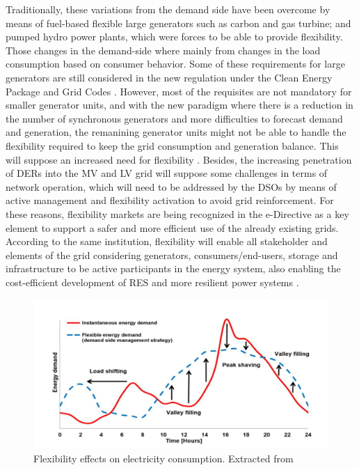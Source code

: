 Traditionally, these variations from the demand side have been overcome by means of fuel-based flexible large generators such as carbon and gas turbine; and pumped hydro power plants, which were forces to be able to provide flexibility. Those changes in the demand-side where mainly from changes in the load consumption based on consumer behavior.
Some of these requirements for large generators are still considered in the new regulation under the Clean Energy Package and Grid Codes \cite{validzic2017clean}. However, most of the requisites are not mandatory for smaller generator units, and with the new paradigm where there is a reduction in the number of synchronous generators and more difficulties to forecast demand and generation, the remanining generator units might not be able to handle the flexibility required to keep the grid consumption and generation balance. This will suppose an increased need for flexibility \cite{Xu2019}. Besides, the increasing penetration of DERs into the MV and LV grid will suppose some challenges in terms of network operation, which will need to be addressed by the DSOs by means of active management and flexibility activation to avoid grid reinforcement. For these reasons, flexibility markets are being recognized in the e-Directive \cite{Directive2019944} as a key element to support a safer and more efficient use of the already existing grids.
According to the same institution, flexibility will enable all stakeholder and elements of the grid considering generators, consumers/end-users, storage and infrastructure to be active participants in the energy system, also enabling the cost-efficient development of RES and more resilient power systems \cite{Hillberg2019}.  

\begin{figure}[h]
	\centering 
	\includegraphics[width=1\columnwidth ]{ChapterIntro/Figures/flex_load_shifting.png}
		\caption{Flexibility effects on electricity consumption. Extracted from \cite{Hillberg2019}}  
		\label{fig:load_shifting}
\end{figure}


